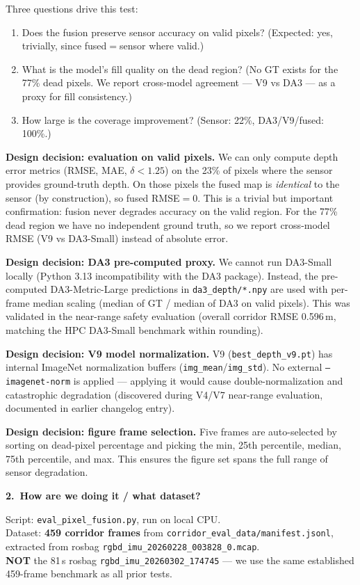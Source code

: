 \documentclass[11pt,a4paper]{article}
\begin{document}
Three questions drive this test:
\begin{enumerate}
  \item Does the fusion preserve sensor accuracy on valid pixels?
    (Expected: yes, trivially, since fused$=$sensor where valid.)
  \item What is the model's fill quality on the dead region?
    (No GT exists for the 77\% dead pixels.  We report cross-model
    agreement --- V9 vs DA3 --- as a proxy for fill consistency.)
  \item How large is the coverage improvement?
    (Sensor: 22\%, DA3/V9/fused: 100\%.)
\end{enumerate}

\textbf{Design decision: evaluation on valid pixels.}
We can only compute depth error metrics (RMSE, MAE, $\delta{<}1.25$)
on the 23\% of pixels where the sensor provides ground-truth depth.
On those pixels the fused map is \emph{identical} to the sensor (by
construction), so fused RMSE$=$0.  This is a trivial but important
confirmation: fusion never degrades accuracy on the valid region.
For the 77\% dead region we have no independent ground truth, so we
report cross-model RMSE (V9 vs DA3-Small) instead of absolute error.

\textbf{Design decision: DA3 pre-computed proxy.}
We cannot run DA3-Small locally (Python 3.13 incompatibility with the
DA3 package).  Instead, the pre-computed DA3-Metric-Large predictions
in \texttt{da3\_depth/*.npy} are used with per-frame median scaling
(median of GT / median of DA3 on valid pixels).  This was validated
in the near-range safety evaluation (overall corridor RMSE 0.596\,m,
matching the HPC DA3-Small benchmark within rounding).

\textbf{Design decision: V9 model normalization.}
V9 (\texttt{best\_depth\_v9.pt}) has internal ImageNet normalization
buffers (\texttt{img\_mean}/\texttt{img\_std}).  No external
\texttt{--imagenet-norm} is applied --- applying it would cause
double-normalization and catastrophic degradation (discovered during
V4/V7 near-range evaluation, documented in earlier changelog entry).

\textbf{Design decision: figure frame selection.}
Five frames are auto-selected by sorting on dead-pixel percentage and
picking the min, 25th percentile, median, 75th percentile, and max.
This ensures the figure set spans the full range of sensor degradation.

\textbf{2.\ How are we doing it / what dataset?}

Script: \texttt{eval\_pixel\_fusion.py}, run on local CPU.\\
Dataset: \textbf{459 corridor frames} from
\texttt{corridor\_eval\_data/manifest.jsonl}, extracted from rosbag
\texttt{rgbd\_imu\_20260228\_003828\_0.mcap}.\\
\textbf{NOT} the 81\,s rosbag \texttt{rgbd\_imu\_20260302\_174745}
--- we use the same established 459-frame benchmark as all prior tests.
\end{document}
